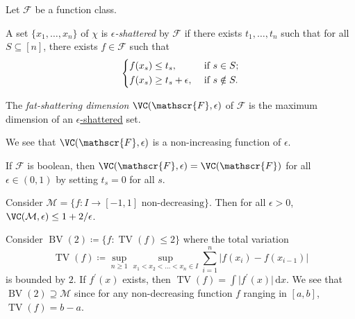 
\begin{definition*}
	Let \(\mathscr{F} \) be a function class.
	\begin{definition}\label{def:eps-shattered}
		A set \(\{ x_1, \dots , x_n \} \) of \(\chi \) is \emph{\(\epsilon \)-shattered} by \(\mathscr{F} \) if there exists \(t_1, \dots , t_n\) such that for all \(S \subseteq [n]\), there exists \(f\in \mathscr{F} \) such that
		\[
			\begin{dcases}
				f(x_s) \leq t_s,             & \text{ if } s\in S ;   \\
				f(x_s) \geq t_s + \epsilon , & \text{ if } s\notin S.
			\end{dcases}
		\]
	\end{definition}
	\begin{definition}\label{def:fat-shattering-dimension}
		The \emph{fat-shattering dimension} \(\VC(\mathscr{F}, \epsilon)\) of \(\mathscr{F} \) is the maximum dimension of an \hyperref[def:eps-shattered]{\(\epsilon\)-shattered} set.
	\end{definition}
\end{definition*}

We see that \(\VC(\mathscr{F} , \epsilon )\) is a non-increasing function of \(\epsilon \).

\begin{note}
	If \(\mathscr{F} \) is boolean, then \(\VC(\mathscr{F} , \epsilon ) = \VC(\mathscr{F} )\) for all \(\epsilon \in (0, 1)\) by setting \(t_s = 0\) for all \(s\).
\end{note}

\begin{eg}
	Consider \(\mathcal{M} = \{ f\colon I \to [-1, 1] \text{ non-decreasing}  \} \). Then for all \(\epsilon > 0\), \(\VC(\mathcal{M} , \epsilon ) \leq 1 + 2 / \epsilon \).
\end{eg}

\begin{eg}
	Consider \(\mathop{\mathrm{BV}}(2) \coloneqq \{ f \colon \mathop{\mathrm{TV}}(f) \leq 2 \} \) where the total variation
	\[
		\mathop{\mathrm{TV}}(f) \coloneqq \sup _{n \geq 1} \sup _{x_1 < x_2 < \dots < x_n \in I} \sum_{i=1}^{n} \vert f(x_i) - f(x_{i-1}) \vert
	\]
	is bounded by \(2\). If \(f^{\prime} (x)\) exists, then \(\mathop{\mathrm{TV}}(f) = \int \vert f^{\prime} (x) \vert \,\mathrm{d} x\). We see that \(\mathop{\mathrm{BV}}(2) \supseteq \mathcal{M} \) since for any non-decreasing function \(f\) ranging in \([a, b]\), \(\mathop{\mathrm{TV}}(f) = b - a\).
\end{eg}

